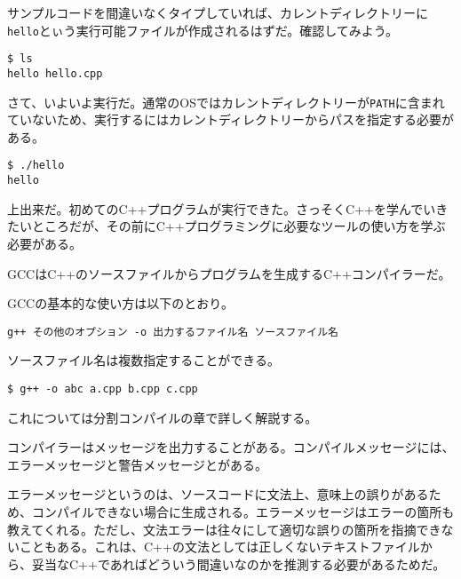サンプルコードを間違いなくタイプしていれば、カレントディレクトリーに\texttt{hello}とぃう実行可能ファイルが作成されるはずだ。確認してみよう。

\begin{lstlisting}[style=terminal]
$ ls
hello hello.cpp
\end{lstlisting}


さて、いよいよ実行だ。通常のOSではカレントディレクトリーが\texttt{PATH}に含まれていないため、実行するにはカレントディレクトリーからパスを指定する必要がある。

\begin{lstlisting}[style=terminal]
$ ./hello
hello
\end{lstlisting}

上出来だ。初めてのC++プログラムが実行できた。さっそくC++を学んでいきたいところだが、その前にC++プログラミングに必要なツールの使い方を学ぶ必要がある。

\clearpage
{}

GCCはC++のソースファイルからプログラムを生成するC++コンパイラーだ。

GCCの基本的な使い方は以下のとおり。

\begin{lstlisting}[style=grammar]
g++ その他のオプション -o 出力するファイル名 ソースファイル名
\end{lstlisting}

ソースファイル名は複数指定することができる。

\begin{lstlisting}[style=terminal]
$ g++ -o abc a.cpp b.cpp c.cpp
\end{lstlisting}

これについては分割コンパイルの章で詳しく解説する。

コンパイラーはメッセージを出力することがある。コンパイルメッセージには、エラーメッセージと警告メッセージとがある。

エラーメッセージというのは、ソースコードに文法上、意味上の誤りがあるため、コンパイルできない場合に生成される。エラーメッセージはエラーの箇所も教えてくれる。ただし、文法エラーは往々にして適切な誤りの箇所を指摘できないこともある。これは、C++の文法としては正しくないテキストファイルから、妥当なC++であればどういう間違いなのかを推測する必要があるためだ。

